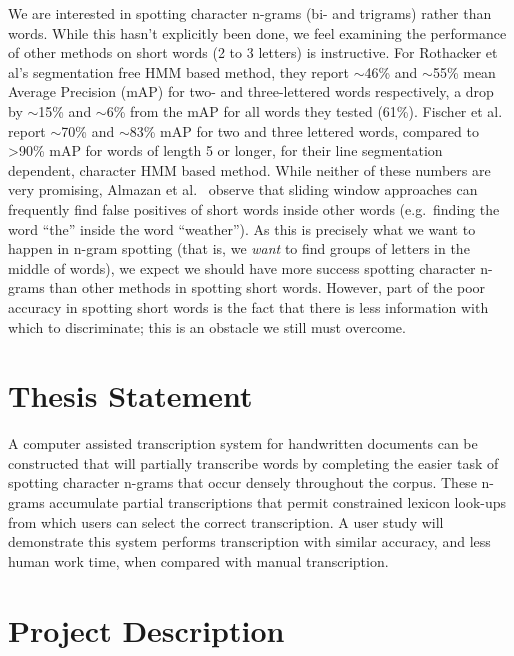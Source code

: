 \documentclass[ms]{byuprop}
\begin{document}
We are interested in spotting character n-grams (bi- and trigrams) rather than words. While this hasn't explicitly been done, we feel examining the performance of other methods on short words (2 to 3 letters) is instructive. For Rothacker et al's \cite{Rothacker2013} segmentation free HMM based method, they report $\sim$46\% and $\sim$55\% mean Average Precision (mAP) for two- and three-lettered words respectively, a drop by $\sim$15\% and $\sim$6\% from the mAP for all words they tested (61\%). Fischer et al.~\cite{Fischer2012} report $\sim$70\% and $\sim$83\% mAP for two and three lettered words, compared to {\textgreater}90\% mAP for words of length 5 or longer, for their line segmentation dependent, character HMM based method. While neither of these numbers are very promising, Almazan et al.~\cite{Almazan2012} observe that sliding window approaches can frequently find false positives of short words inside other words (e.g.~finding the word ``the'' inside the word ``weather''). As this is precisely what we want to happen in n-gram spotting (that is, we \textit{want} to find groups of letters in the middle of words), we expect we should have more success spotting character n-grams than other methods in spotting short words. However, part of the poor accuracy in spotting short words is the fact that there is less information with which to discriminate; this is an obstacle we still must overcome.


\section{Thesis Statement}


A computer assisted transcription system for handwritten documents can be constructed that will partially transcribe words by completing the easier task of spotting character n-grams that occur densely throughout the corpus. These n-grams accumulate partial transcriptions that permit constrained lexicon look-ups from which users can select the correct transcription. A user study will demonstrate this system performs transcription with similar accuracy, and less human work time, when compared with manual transcription.

\section{Project Description}
\end{document}
